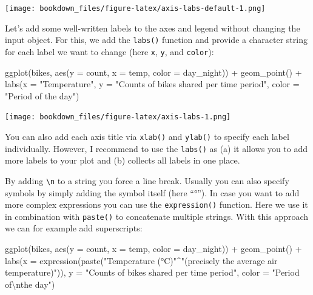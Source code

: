 \documentclass[
]{krantz}
\makeatletter
\newenvironment{Shaded}{\begin{snugshade}}{\end{snugshade}}
\newcommand{\AttributeTok}[1]{\textcolor[rgb]{0.61,0.61,0.61}{#1}}
\newcommand{\FunctionTok}[1]{\textcolor[rgb]{0,0,0}{#1}}
\newcommand{\NormalTok}[1]{#1}
\newcommand{\SpecialCharTok}[1]{\textcolor[rgb]{0,0,0}{#1}}
\newcommand{\StringTok}[1]{\textcolor[rgb]{0.5,0.5,0.5}{#1}}
\newenvironment{kframe}{%
\medskip{}
\setlength{\fboxsep}{.8em}
 \def\at@end@of@kframe{}%
 \ifinner\ifhmode%
  \def\at@end@of@kframe{\end{minipage}}%
  \begin{minipage}{\columnwidth}%
 \fi\fi%
 \def\FrameCommand##1{\hskip\@totalleftmargin \hskip-\fboxsep
 \colorbox{shadecolor}{##1}\hskip-\fboxsep
     \hskip-\linewidth \hskip-\@totalleftmargin \hskip\columnwidth}%
 \MakeFramed {\advance\hsize-\width
   \@totalleftmargin\z@ \linewidth\hsize
   \@setminipage}}%
 {\par\unskip\endMakeFramed%
 \at@end@of@kframe}
\renewenvironment{Shaded}{\begin{kframe}}{\end{kframe}}
\makeatother
\begin{document}
\texttt{[image: bookdown\_files/figure-latex/axis-labs-default-1.png]}

Let's add some well-written labels to the axes and legend without changing the input object. For this, we add the \texttt{labs()} function and provide a character string for each label we want to change (here \texttt{x}, \texttt{y}, and \texttt{color}):

\begin{Shaded}
\begin{Highlighting}[]
\FunctionTok{ggplot}\NormalTok{(bikes, }\FunctionTok{aes}\NormalTok{(}\AttributeTok{y =}\NormalTok{ count, }\AttributeTok{x =}\NormalTok{ temp, }\AttributeTok{color =}\NormalTok{ day\_night)) }\SpecialCharTok{+} 
  \FunctionTok{geom\_point}\NormalTok{() }\SpecialCharTok{+}
  \FunctionTok{labs}\NormalTok{(}\AttributeTok{x =} \StringTok{"Temperature"}\NormalTok{, }
       \AttributeTok{y =} \StringTok{"Counts of bikes shared per time period"}\NormalTok{,}
       \AttributeTok{color =} \StringTok{"Period of the day"}\NormalTok{)}
\end{Highlighting}
\end{Shaded}

\texttt{[image: bookdown\_files/figure-latex/axis-labs-1.png]}

You can also add each axis title via \texttt{xlab()} and \texttt{ylab()} to specify each label individually. However, I recommend to use the \texttt{labs()} as (a) it allows you to add more labels to your plot and (b) collects all labels in one place.

By adding \texttt{\textbackslash{}n} to a string you force a line break. Usually you can also specify symbols by simply adding the symbol itself (here ``°''). In case you want to add more complex expressions you can use the \texttt{expression()} function. Here we use it in combination with \texttt{paste()} to concatenate multiple strings. With this approach we can for example add superscripts:

\begin{Shaded}
\begin{Highlighting}[]
\FunctionTok{ggplot}\NormalTok{(bikes, }\FunctionTok{aes}\NormalTok{(}\AttributeTok{y =}\NormalTok{ count, }\AttributeTok{x =}\NormalTok{ temp, }\AttributeTok{color =}\NormalTok{ day\_night)) }\SpecialCharTok{+} 
  \FunctionTok{geom\_point}\NormalTok{() }\SpecialCharTok{+}
  \FunctionTok{labs}\NormalTok{(}\AttributeTok{x =} \FunctionTok{expression}\NormalTok{(}\FunctionTok{paste}\NormalTok{(}\StringTok{"Temperature (°C)"}\SpecialCharTok{\^{}}\StringTok{"(precisely the average air temperature)"}\NormalTok{)),}
       \AttributeTok{y =} \StringTok{"Counts of bikes shared per time period"}\NormalTok{,}
       \AttributeTok{color =} \StringTok{"Period of}\SpecialCharTok{\textbackslash{}n}\StringTok{the day"}\NormalTok{)}
\end{Highlighting}
\end{Shaded}
\end{document}
